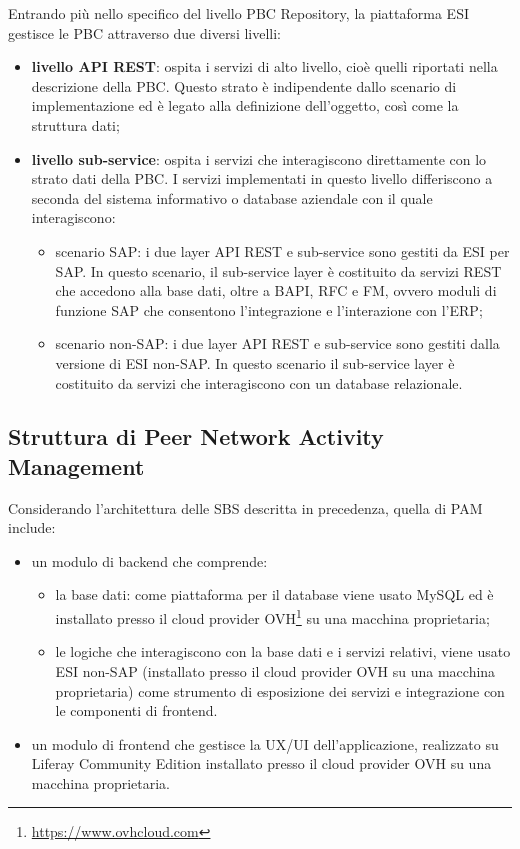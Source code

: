 Entrando più nello specifico del livello \ac{PBC} Repository, la piattaforma \ac{ESI} gestisce le \ac{PBC}
attraverso due diversi livelli:
\begin{itemize}
    \item \textbf{livello API REST}: ospita i servizi di alto livello, cioè quelli riportati nella descrizione
    della \ac{PBC}. Questo strato è indipendente dallo scenario di implementazione ed è legato alla
    definizione dell’oggetto, così come la struttura dati;
    \item \textbf{livello sub-service}: ospita i servizi che interagiscono direttamente con lo strato dati
    della \ac{PBC}. I servizi implementati in questo livello differiscono a seconda del sistema informativo
    o database aziendale con il quale interagiscono:
    \begin{itemize}
        \item scenario SAP: i due layer API REST e sub-service sono gestiti da \ac{ESI} per SAP.
        In questo scenario, il sub-service layer è costituito da servizi REST che accedono alla base dati,
        oltre a BAPI, RFC e FM, ovvero moduli di funzione SAP che consentono l'integrazione e l'interazione con l'\ac{ERP};
        \item scenario non-SAP: i due layer API REST e sub-service sono gestiti dalla versione
        di \ac{ESI} non-SAP. In questo scenario il sub-service layer è costituito da servizi che
        interagiscono con un database relazionale.
    \end{itemize}
\end{itemize}

    \subsection{Struttura di Peer Network Activity Management}
    Considerando l’architettura delle \ac{SBS} descritta in precedenza, quella di \ac{PAM} include:
    \begin{itemize}
        \item un modulo di backend che comprende:
        \begin{itemize}
            \item la base dati: come piattaforma per il database viene usato MySQL ed è installato presso il
            cloud provider OVH\footnote{\url{https://www.ovhcloud.com}} su una macchina proprietaria;
            \item le logiche che interagiscono con la base dati e i servizi relativi, viene usato
            \ac{ESI} non-SAP (installato presso il cloud provider OVH su una macchina proprietaria) come
            strumento di esposizione dei servizi e integrazione con le componenti di frontend.
        \end{itemize}
        \item un modulo di frontend che gestisce la UX/UI dell’applicazione, realizzato su
        Liferay Community Edition installato presso il cloud provider OVH su una macchina proprietaria.
    \end{itemize}


